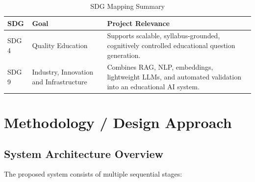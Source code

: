 \documentclass[12pt,a4paper]{report}
\begin{document}
\begin{table}[H]
\centering
\caption{SDG Mapping Summary}
\label{tab:sdg}
\begin{tabularx}{\textwidth}{P{0.18\textwidth} P{0.25\textwidth} Y}
\toprule
\textbf{SDG} & \textbf{Goal} & \textbf{Project Relevance}\\
\midrule

SDG 4 &
Quality Education &
Supports scalable, syllabus-grounded, cognitively controlled educational question generation.
\\

SDG 9 &
Industry, Innovation and Infrastructure &
Combines RAG, NLP, embeddings, lightweight LLMs, and automated validation into an educational AI system.
\\

\bottomrule
\end{tabularx}
\end{table}


\chapter{Methodology / Design Approach}

\section{System Architecture Overview}

The proposed system consists of multiple sequential stages:
\end{document}
